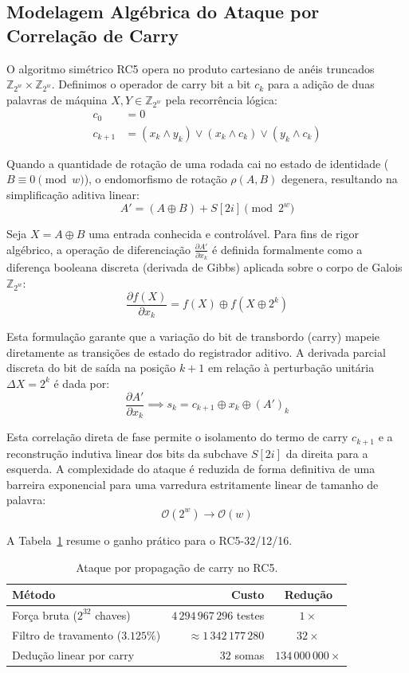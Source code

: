 \documentclass[12pt,a4paper]{article}
\theoremstyle{plain}
\begin{document}
\subsection{Modelagem Algébrica do Ataque por Correlação de Carry}

O algoritmo simétrico RC5 opera no produto cartesiano de anéis truncados
$\mathbb{Z}_{2^w} \times \mathbb{Z}_{2^w}$.  Definimos o operador de
carry bit a bit $c_k$ para a adição de duas palavras de máquina
$X, Y \in \mathbb{Z}_{2^w}$ pela recorrência lógica:
\begin{align*}
c_0 &= 0 \\
c_{k+1} &= (x_k \wedge y_k) \vee (x_k \wedge c_k) \vee (y_k \wedge c_k)
\end{align*}

Quando a quantidade de rotação de uma rodada cai no estado de
identidade ($B \equiv 0 \pmod w$), o endomorfismo de rotação
$\rho(A, B)$ degenera, resultando na simplificação aditiva linear:
\[
A' = (A \oplus B) + S[2i] \pmod{2^w}
\]

Seja $X = A \oplus B$ uma entrada conhecida e controlável.  Para
fins de rigor algébrico, a operação de diferenciação
$\frac{\partial A'}{\partial x_k}$ é definida formalmente como a
diferença booleana discreta (derivada de Gibbs) aplicada sobre o
corpo de Galois $\mathbb{Z}_{2^w}$:
\[
\frac{\partial f(X)}{\partial x_k} = f(X) \oplus f(X \oplus 2^k)
\]

Esta formulação garante que a variação do bit de transbordo (carry)
mapeie diretamente as transições de estado do registrador aditivo.
A derivada parcial discreta do bit de saída na posição $k+1$ em
relação à perturbação unitária $\Delta X = 2^k$ é dada por:
\[
\frac{\partial A'}{\partial x_k} \implies
s_k = c_{k+1} \oplus x_k \oplus (A')_k
\]

Esta correlação direta de fase permite o isolamento do termo de carry
$c_{k+1}$ e a reconstrução indutiva linear dos bits da subchave
$S[2i]$ da direita para a esquerda.  A complexidade do ataque é
reduzida de forma definitiva de uma barreira exponencial para uma
varredura estritamente linear de tamanho de palavra:
\[
\mathcal{O}(2^w) \longrightarrow \mathcal{O}(w)
\]

A Tabela~\ref{tab:carry} resume o ganho prático para o RC5-32/12/16.

\begin{table}[htbp]
\centering
\caption{Ataque por propagação de carry no RC5.}
\label{tab:carry}
\begin{tabular}{lrc}
\hline
Método & Custo & Redução \\
\hline
Força bruta ($2^{32}$ chaves) & $4\,294\,967\,296$ testes & $1\times$ \\
Filtro de travamento ($3.125\%$) & $\approx 1\,342\,177\,280$ & $32\times$ \\
Dedução linear por carry & $32$ somas & $134\,000\,000\times$ \\
\hline
\end{tabular}
\end{table}
\end{document}
